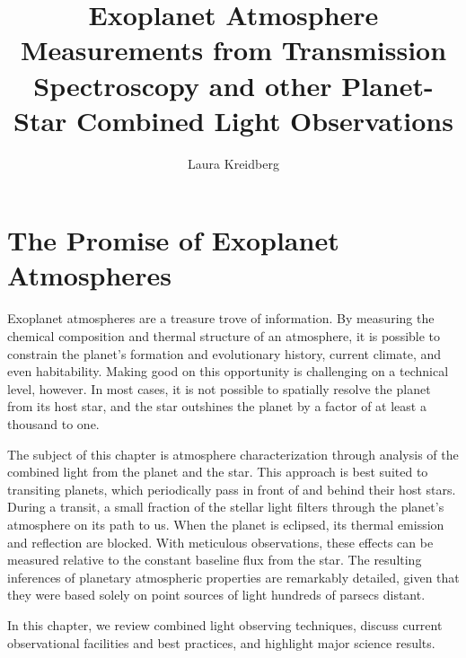 \documentclass[graybox,natbib,nosecnum]{svmult}
\begin{document}
\title*{Exoplanet Atmosphere Measurements from Transmission Spectroscopy and other Planet-Star Combined Light Observations}
\author{Laura Kreidberg}
%
%
\maketitle



\section{The Promise of Exoplanet Atmospheres}
Exoplanet atmospheres are a treasure trove of information. By measuring the chemical composition and thermal structure of an atmosphere, it is possible to constrain the planet's formation and evolutionary history, current climate, and even habitability.  Making good on this opportunity is challenging on a technical level, however. In most cases, it is not possible to spatially resolve the planet from its host star, and the star outshines the planet by a factor of at least a thousand to one. 

The subject of this chapter is atmosphere characterization through analysis of the combined light from the planet and the star. This approach is best suited to transiting planets, which periodically pass in front of and behind their host stars. During a transit, a small fraction of the stellar light filters through the planet's atmosphere on its path to us. When the planet is eclipsed, its thermal emission and reflection are blocked.  With meticulous observations, these effects can be measured relative to the constant baseline flux from the star. The resulting inferences of planetary atmospheric properties are remarkably detailed, given that they were based solely on point sources of light hundreds of parsecs distant.

In this chapter, we review combined light observing techniques, discuss current observational facilities and best practices, and highlight major science results.
\end{document}

